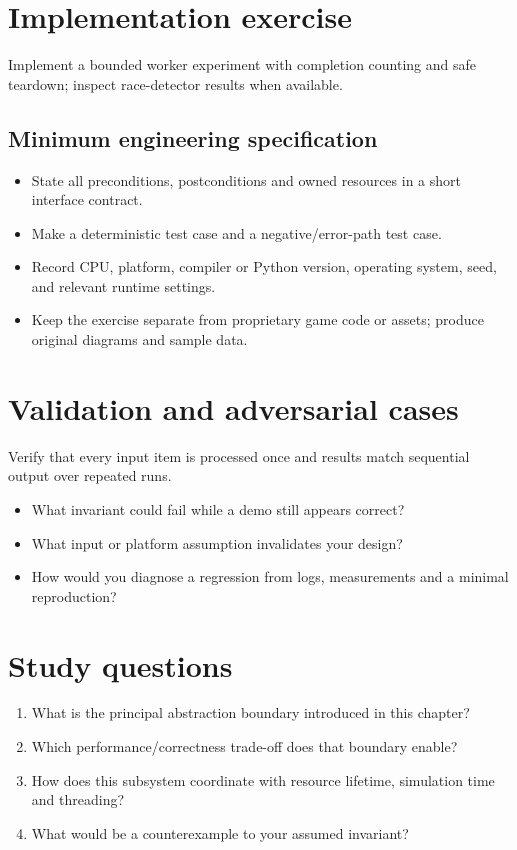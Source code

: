 \documentclass[11pt,letterpaper]{article}
\begin{document}
\section{Implementation exercise}
Implement a bounded worker experiment with completion counting and safe teardown; inspect race-detector results when available.

\subsection{Minimum engineering specification}
\begin{itemize}
\item State all preconditions, postconditions and owned resources in a short interface contract.
\item Make a deterministic test case and a negative/error-path test case.
\item Record CPU, platform, compiler or Python version, operating system, seed, and relevant runtime settings.
\item Keep the exercise separate from proprietary game code or assets; produce original diagrams and sample data.
\end{itemize}
\section{Validation and adversarial cases}
Verify that every input item is processed once and results match sequential output over repeated runs.

\begin{itemize}
\item What invariant could fail while a demo still appears correct?
\item What input or platform assumption invalidates your design?
\item How would you diagnose a regression from logs, measurements and a minimal reproduction?
\end{itemize}
\section{Study questions}
\begin{enumerate}
\item What is the principal abstraction boundary introduced in this chapter?
\item Which performance/correctness trade-off does that boundary enable?
\item How does this subsystem coordinate with resource lifetime, simulation time and threading?
\item What would be a counterexample to your assumed invariant?
\end{enumerate}
\end{document}
